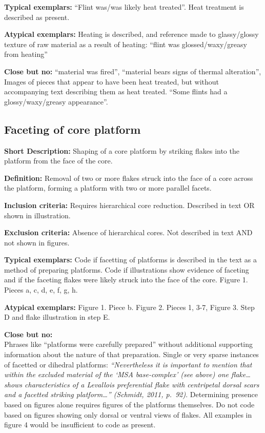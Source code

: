\documentclass[
]{article}
\begin{document}
\textbf{Typical exemplars:} ``Flint was/was likely heat treated''. Heat
treatment is described as present.

\textbf{Atypical exemplars:} Heating is described, and reference made to
glassy/glossy texture of raw material as a result of heating: ``flint
was glossed/waxy/greasy from heating''

\textbf{Close but no:} ``material was fired'', ``material bears signs of
thermal alteration'', Images of pieces that appear to have been heat
treated, but without accompanying text describing them as heat treated.
``Some flints had a glossy/waxy/greasy appearance''.

\hypertarget{faceting-of-core-platform}{%
\subsection{Faceting of core platform}\label{faceting-of-core-platform}}

\textbf{Short Description:} Shaping of a core platform by striking
flakes into the platform from the face of the core.

\textbf{Definition:} Removal of two or more flakes struck into the face
of a core across the platform, forming a platform with two or more
parallel facets.

\textbf{Inclusion criteria:} Requires hierarchical core reduction.
Described in text OR shown in illustration.

\textbf{Exclusion criteria:} Absence of hierarchical cores. Not
described in text AND not shown in figures.

\textbf{Typical exemplars:} Code if facetting of platforms is described
in the text as a method of preparing platforms. Code if illustrations
show evidence of faceting and if the faceting flakes were likely struck
into the face of the core. Figure 1. Pieces a, c, d, e, f, g, h.

\textbf{Atypical exemplars:} Figure 1. Piece b. Figure 2. Pieces 1, 3-7,
Figure 3. Step D and flake illustration in step E.

\textbf{Close but no:}\\
Phrases like ``platforms were carefully prepared'' without additional
supporting information about the nature of that preparation. Single or
very sparse instances of facetted or dihedral platforms:
\emph{``Nevertheless it is important to mention that within the excluded
material of the `MSA base-complex' (see above) one flake\ldots{} shows
characteristics of a Levallois preferential flake with centripetal
dorsal scars and a facetted striking platform\ldots{}'' (Schmidt, 2011,
p.~92)}. Determining presence based on figures alone requires figures of
the platforms themselves. Do not code based on figures showing only
dorsal or ventral views of flakes. All examples in figure 4 would be
insufficient to code as present.
\end{document}
